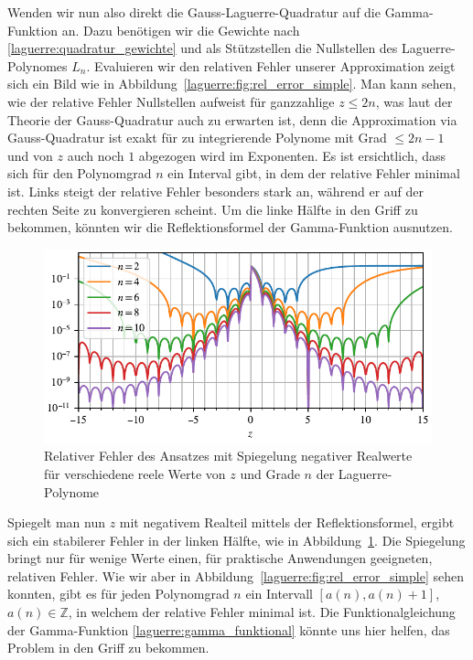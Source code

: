 Wenden wir nun also direkt die Gauss-Laguerre-Quadratur auf die Gamma-Funktion
an.
Dazu benötigen wir die Gewichte nach
\eqref{laguerre:quadratur_gewichte}
und als Stützstellen die Nullstellen des Laguerre-Polynomes $L_n$.
Evaluieren wir den relativen Fehler unserer Approximation zeigt sich ein
Bild wie in Abbildung~\ref{laguerre:fig:rel_error_simple}.
Man kann sehen,
wie der relative Fehler Nullstellen aufweist für ganzzahlige $z \leq 2n$,
was laut der Theorie der Gauss-Quadratur auch zu erwarten ist,
denn die Approximation via Gauss-Quadratur
ist exakt für zu integrierende Polynome mit Grad $\leq 2n-1$
und von $z$ auch noch $1$ abgezogen wird im Exponenten.
Es ist ersichtlich,
dass sich für den Polynomgrad $n$ ein Interval gibt,
in dem der relative Fehler minimal ist.
Links steigt der relative Fehler besonders stark an,
während er auf der rechten Seite zu konvergieren scheint.
Um die linke Hälfte in den Griff zu bekommen,
könnten wir die Reflektionsformel der Gamma-Funktion ausnutzen.

\begin{figure}
\centering
% 
\includegraphics{papers/laguerre/images/rel_error_mirror.pdf}
\caption{Relativer Fehler des Ansatzes mit Spiegelung negativer Realwerte
für verschiedene reele Werte von $z$ und Grade $n$ der Laguerre-Polynome}
\label{laguerre:fig:rel_error_mirror}
\end{figure}

Spiegelt man nun $z$ mit negativem Realteil mittels der Reflektionsformel,
ergibt sich ein stabilerer Fehler in der linken Hälfte,
wie in Abbildung~\ref{laguerre:fig:rel_error_mirror}.
Die Spiegelung bringt nur für wenige Werte einen,
für praktische Anwendungen geeigneten,
relativen Fehler.
Wie wir aber in Abbildung~\ref{laguerre:fig:rel_error_simple} sehen konnten,
gibt es für jeden Polynomgrad $n$ ein Intervall $[a(n), a(n) + 1]$,
$a(n) \in \mathbb{Z}$,
in welchem der relative Fehler minimal ist.
Die Funktionalgleichung der Gamma-Funktion \eqref{laguerre:gamma_funktional}
könnte uns hier helfen,
das Problem in den Griff zu bekommen.

